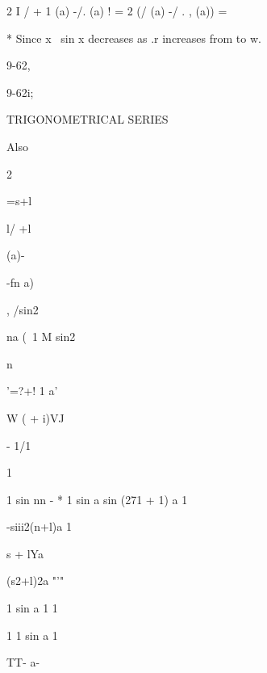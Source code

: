 2 I / + 1 (a) -/. (a) ! = 2 (/ (a) -/ . , (a)) =

* Since x~ sin x decreases as .r increases from to w.



9-62,


9-62i;






TRIGONOMETRICAL SERIES




Also
















2

=s+l


l/ +l


(a)-


-fn a)


, /sin2


na (\ 1 M sin2




n


'=?+! 1 a'


W ( + i)VJ












- 1/1

1


1 sin nn - * 1 sin a sin (271 + 1) a 1


-siii2(n+l)a 1




  s + lYa \














 (s2+l)2a "'"


1 sin a 1 1














1 1 sin a 1

TT- a-


